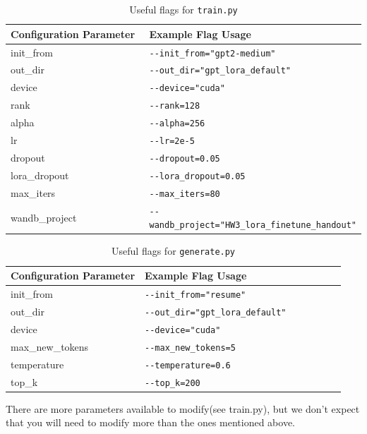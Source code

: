 \documentclass[11pt,addpoints,answers]{exam}
\begin{document}
\begin{questions}
\begin{table}[h!]
\centering
\begin{tabular}{|p{0.4\linewidth}|p{0.6\linewidth}|}
\hline
Configuration Parameter & Example Flag Usage \\ \hline
init\_from &  \lstinline|--init_from="gpt2-medium"|  \\ \hline
out\_dir &  \lstinline|--out_dir="gpt_lora_default"| \\ \hline
device & \lstinline|--device="cuda"| \\ \hline
rank &  \lstinline|--rank=128|  \\ \hline
alpha &  \lstinline|--alpha=256|  \\ \hline
lr &  \lstinline|--lr=2e-5|  \\ \hline
dropout & \lstinline|--dropout=0.05| \\ \hline
lora\_dropout & \lstinline|--lora_dropout=0.05| \\ \hline
max\_iters &  \lstinline|--max_iters=80| \\ \hline
wandb\_project &  \lstinline|--wandb_project="HW3_lora_finetune_handout"| \\ \hline
\end{tabular}
\caption{Useful flags for \lstinline{train.py}}
\label{table:flag1}
\end{table}

\begin{table}[h!]
\centering
\begin{tabular}{|p{0.4\linewidth}|p{0.6\linewidth}|}
\hline
Configuration Parameter & Example Flag Usage \\ \hline
init\_from & \lstinline|--init_from="resume"| \\ \hline
out\_dir &  \lstinline|--out_dir="gpt_lora_default"| \\ \hline
device & \lstinline|--device="cuda"| \\ \hline
max\_new\_tokens & \lstinline|--max_new_tokens=5| \\ \hline
temperature & \lstinline|--temperature=0.6| \\ \hline
top\_k & \lstinline|--top_k=200| \\ \hline
\end{tabular}
\caption{Useful flags for \lstinline{generate.py}}
\label{table:flag2}
\end{table}


There are more parameters available to modify(see train.py), but we don't expect that you will need to modify more than the ones mentioned above.


\end{questions}
\end{document}

